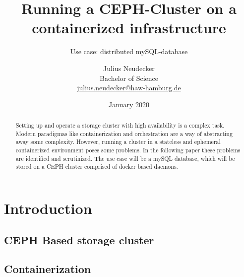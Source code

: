 \documentclass[titlepage, a4paper, 11pt]{scrartcl}
\title{Running a CEPH-Cluster on a containerized infrastructure}
\subtitle{Use case: distributed mySQL-database}
\author{Julius Neudecker \\ Bachelor of Science \\ \href{mailto:julius.neudecker@haw-hamburg.de}{julius.neudecker@haw-hamburg.de}}
\date{January 2020}
\begin{document}
    \maketitle

    \tableofcontents

    \begin{abstract}
        Setting up and operate a storage cluster with high availability is a complex task. Modern paradigmas like containerization
        and orchestration are a way of abstracting away some complexity. However, running a cluster in a stateless and ephemeral
        containerized environment poses some problems. In the following paper these problems are identified and scrutinized.
        The use case will be a mySQL database, which will be stored on a CEPH cluster comprised of docker based daemons.
    \end{abstract}

    \section{Introduction}






        \subsection{CEPH Based storage cluster}


        \subsection{Containerization}
\end{document}

